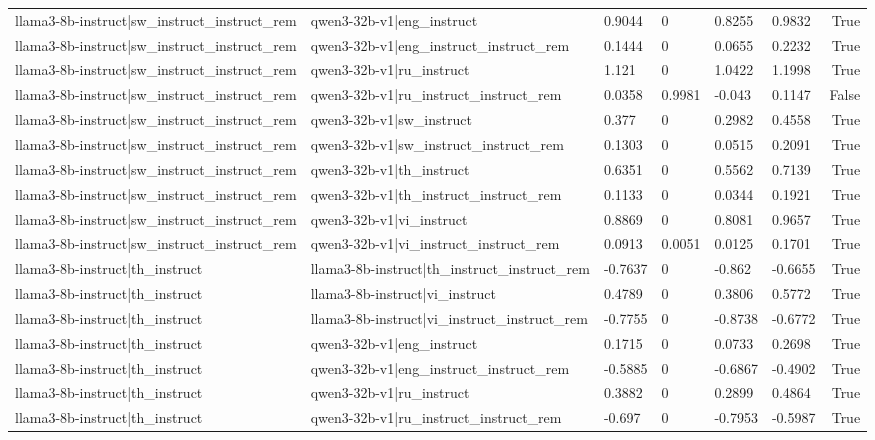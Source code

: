 \begin{table}
\begin{tabular}{llllllr}
llama3-8b-instruct|sw_instruct_instruct_rem & qwen3-32b-v1|eng_instruct & 0.9044 & 0 & 0.8255 & 0.9832 & True \\
llama3-8b-instruct|sw_instruct_instruct_rem & qwen3-32b-v1|eng_instruct_instruct_rem & 0.1444 & 0 & 0.0655 & 0.2232 & True \\
llama3-8b-instruct|sw_instruct_instruct_rem & qwen3-32b-v1|ru_instruct & 1.121 & 0 & 1.0422 & 1.1998 & True \\
llama3-8b-instruct|sw_instruct_instruct_rem & qwen3-32b-v1|ru_instruct_instruct_rem & 0.0358 & 0.9981 & -0.043 & 0.1147 & False \\
llama3-8b-instruct|sw_instruct_instruct_rem & qwen3-32b-v1|sw_instruct & 0.377 & 0 & 0.2982 & 0.4558 & True \\
llama3-8b-instruct|sw_instruct_instruct_rem & qwen3-32b-v1|sw_instruct_instruct_rem & 0.1303 & 0 & 0.0515 & 0.2091 & True \\
llama3-8b-instruct|sw_instruct_instruct_rem & qwen3-32b-v1|th_instruct & 0.6351 & 0 & 0.5562 & 0.7139 & True \\
llama3-8b-instruct|sw_instruct_instruct_rem & qwen3-32b-v1|th_instruct_instruct_rem & 0.1133 & 0 & 0.0344 & 0.1921 & True \\
llama3-8b-instruct|sw_instruct_instruct_rem & qwen3-32b-v1|vi_instruct & 0.8869 & 0 & 0.8081 & 0.9657 & True \\
llama3-8b-instruct|sw_instruct_instruct_rem & qwen3-32b-v1|vi_instruct_instruct_rem & 0.0913 & 0.0051 & 0.0125 & 0.1701 & True \\
llama3-8b-instruct|th_instruct & llama3-8b-instruct|th_instruct_instruct_rem & -0.7637 & 0 & -0.862 & -0.6655 & True \\
llama3-8b-instruct|th_instruct & llama3-8b-instruct|vi_instruct & 0.4789 & 0 & 0.3806 & 0.5772 & True \\
llama3-8b-instruct|th_instruct & llama3-8b-instruct|vi_instruct_instruct_rem & -0.7755 & 0 & -0.8738 & -0.6772 & True \\
llama3-8b-instruct|th_instruct & qwen3-32b-v1|eng_instruct & 0.1715 & 0 & 0.0733 & 0.2698 & True \\
llama3-8b-instruct|th_instruct & qwen3-32b-v1|eng_instruct_instruct_rem & -0.5885 & 0 & -0.6867 & -0.4902 & True \\
llama3-8b-instruct|th_instruct & qwen3-32b-v1|ru_instruct & 0.3882 & 0 & 0.2899 & 0.4864 & True \\
llama3-8b-instruct|th_instruct & qwen3-32b-v1|ru_instruct_instruct_rem & -0.697 & 0 & -0.7953 & -0.5987 & True \\

\end{tabular}
\end{table}
